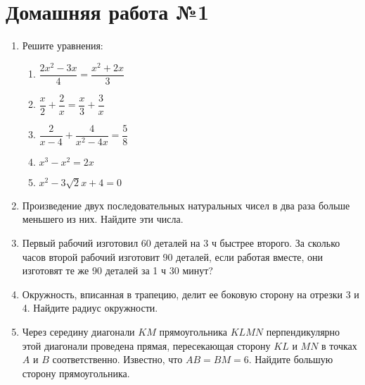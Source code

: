 \documentclass[12pt, a5paper]{article}
\begin{document}
	
	
	\section*{Домашняя работа №1}
	\begin{enumerate}
		\item Решите уравнения:
		\begin{enumerate}[label=\asbuk*)]
			\item $\dfrac{2x^2-3x}{4}=\dfrac{x^2+2x}{3}$
			\item $\dfrac{x}{2}+\dfrac{2}{x}=\dfrac{x}{3}+\dfrac{3}{x}$
			\item $\dfrac{2}{x-4}+\dfrac{4}{x^2-4x}=\dfrac{5}{8}$
			\item $x^3-x^2=2x$
			\item $x^2-3\sqrt{2}x+4=0$
		\end{enumerate}
		\item Произведение двух последовательных натуральных чисел в два раза больше меньшего из них. Найдите эти числа.
		\item Первый рабочий изготовил 60 деталей на 3 ч быстрее второго. За сколько часов второй рабочий изготовит 90 деталей, если работая вместе, они изготовят те же 90 деталей за 1 ч 30 минут?
		\item Окружность, вписанная в трапецию, делит ее боковую сторону на отрезки 3 и 4. Найдите радиус окружности.
		\item Через середину диагонали $KM$ прямоугольника $KLMN$ перпендикулярно этой диагонали проведена прямая, пересекающая сторону $KL$ и $MN$ в точках $A$ и $B$ соответственно. Известно, что $AB=BM=6$. Найдите большую сторону прямоугольника.
	\end{enumerate}
\end{document}
